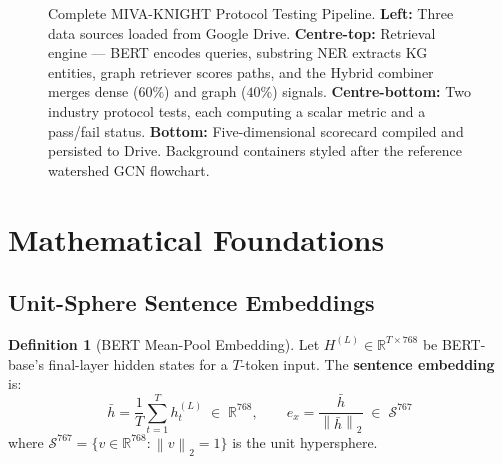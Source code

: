 \documentclass[12pt,a4paper]{article}
\theoremstyle{definition}
\newtheorem{definition}{Definition}[section]
\theoremstyle{plain}
\theoremstyle{remark}
\newcommand{\R}{\mathbb{R}}
\newcommand{\Norm}[1]{\left\|#1\right\|_2}
\begin{document}
\begin{figure}[htbp]
{
}
\caption{%
Complete MIVA-KNIGHT Protocol Testing Pipeline.
\textbf{Left:} Three data sources loaded from Google Drive.
\textbf{Centre-top:} Retrieval engine --- BERT encodes queries, substring NER
extracts KG entities, graph retriever scores paths, and the Hybrid combiner
merges dense ($60\%$) and graph ($40\%$) signals.
\textbf{Centre-bottom:} Two industry protocol tests, each computing a scalar
metric and a pass/fail status.
\textbf{Bottom:} Five-dimensional scorecard compiled and persisted to Drive.
Background containers styled after the reference watershed GCN flowchart.}
\label{fig:pipeline}
\end{figure}

\newpage
\section{Mathematical Foundations}

\subsection{Unit-Sphere Sentence Embeddings}

\begin{definition}[BERT Mean-Pool Embedding]
\label{def:embed}
Let $H^{(L)} \in \R^{T \times 768}$ be BERT-base's final-layer hidden
states for a $T$-token input.  The \textbf{sentence embedding} is:
\[
  \bar{h} = \frac{1}{T}\sum_{t=1}^{T} h_t^{(L)} \;\in\; \R^{768},
  \qquad
  e_x = \frac{\bar{h}}{\Norm{\bar{h}}} \;\in\; \mathcal{S}^{767}
\]
where $\mathcal{S}^{767} = \{v \in \R^{768} : \Norm{v} = 1\}$ is the
unit hypersphere.
\end{definition}
\end{document}

